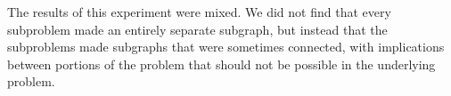 \documentclass[11pt,twoside]{article}
\begin{document}
The results of this experiment were mixed. We did not find that every subproblem made an entirely separate subgraph, but instead that the subproblems made subgraphs that were sometimes connected, with implications between portions of the problem that should not be possible in the underlying problem.

\end{document}
